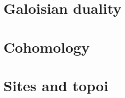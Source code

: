 \documentclass{cambridge7A}
\begin{document}
\part{Galoisian duality}%
\label{prt:galoisian_duality}

\noindent 


\part{Cohomology}%
\label{prt:cohomology}

\noindent 


\part{Sites and topoi}%
\label{prt:sites_and_topoi}

\noindent 


\backmatter




%
%

\end{document}
